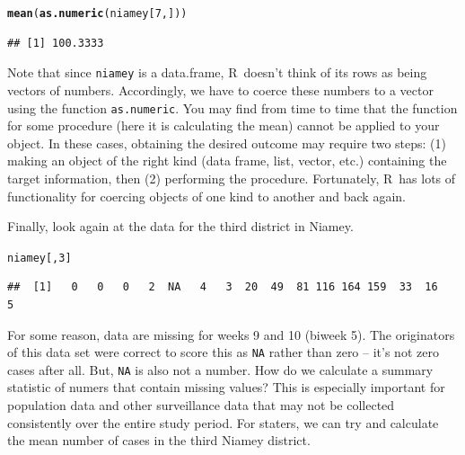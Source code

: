 \documentclass{article}\usepackage[]{graphicx}\usepackage[]{color}
\makeatletter
\newcommand{\hlnum}[1]{\textcolor[rgb]{0.686,0.059,0.569}{#1}}%
\newcommand{\hlstd}[1]{\textcolor[rgb]{0.345,0.345,0.345}{#1}}%
\newcommand{\hlkwd}[1]{\textcolor[rgb]{0.737,0.353,0.396}{\textbf{#1}}}%
\newenvironment{kframe}{%
 \def\at@end@of@kframe{}%
 \ifinner\ifhmode%
  \def\at@end@of@kframe{\end{minipage}}%
  \begin{minipage}{\columnwidth}%
 \fi\fi%
 \def\FrameCommand##1{\hskip\@totalleftmargin \hskip-\fboxsep
 \colorbox{shadecolor}{##1}\hskip-\fboxsep
     \hskip-\linewidth \hskip-\@totalleftmargin \hskip\columnwidth}%
 \MakeFramed {\advance\hsize-\width
   \@totalleftmargin\z@ \linewidth\hsize
   \@setminipage}}%
 {\par\unskip\endMakeFramed%
 \at@end@of@kframe}
\newenvironment{knitrout}{}{} %
\newcommand{\R}{\textsf{R}}
\newcommand{\code}[1]{\texttt{#1}}
\theoremstyle{exercise}
\makeatother
\begin{document}
\begin{knitrout}
\color{fgcolor}\begin{kframe}
\begin{alltt}
\hlkwd{mean}\hlstd{(}\hlkwd{as.numeric}\hlstd{(niamey[}\hlnum{7}\hlstd{,]))}
\end{alltt}
\begin{verbatim}
## [1] 100.3333
\end{verbatim}
\end{kframe}
\end{knitrout}

Note that since \code{niamey} is a data.frame, \R\ doesn't think of its rows as being vectors of numbers. Accordingly, we have to coerce these numbers to a vector using the function \code{as.numeric}. You may find from time to time that the function for some procedure (here it is calculating the mean) cannot be applied to your object. In these cases, obtaining the desired outcome may require two steps: (1) making an object of the right kind (data frame, list, vector, etc.) containing the target information, then (2) performing the procedure. Fortunately, \R\ has lots of functionality for coercing objects of one kind to another and back again.

Finally, look again at the data for the third district in Niamey. 

\begin{knitrout}
\color{fgcolor}\begin{kframe}
\begin{alltt}
\hlstd{niamey[,}\hlnum{3}\hlstd{]}
\end{alltt}
\begin{verbatim}
##  [1]   0   0   0   2  NA   4   3  20  49  81 116 164 159  33  16   5
\end{verbatim}
\end{kframe}
\end{knitrout}

For some reason, data are missing for weeks 9 and 10 (biweek 5). The originators of this data set were correct to score this as \code{NA} rather than zero -- it's not zero cases after all. But, \code{NA} is also not a number. How do we calculate a summary statistic of numers that contain missing values? This is especially important for population data and other surveillance data that may not be collected consistently over the entire study period. For staters, we can try and calculate the mean number of cases in the third Niamey district.
\end{document}

